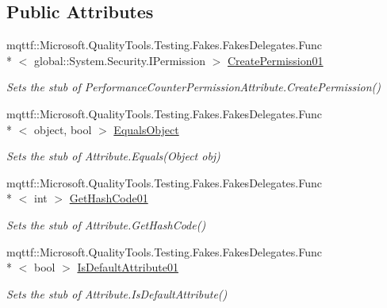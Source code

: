 \subsection*{Public Attributes}
\begin{DoxyCompactItemize}
\item 
mqttf\-::\-Microsoft.\-Quality\-Tools.\-Testing.\-Fakes.\-Fakes\-Delegates.\-Func\\*
$<$ global\-::\-System.\-Security.\-I\-Permission $>$ \hyperlink{class_system_1_1_diagnostics_1_1_fakes_1_1_stub_performance_counter_permission_attribute_a19013c5c5f0a584ab1659b14c14b2a77}{Create\-Permission01}
\begin{DoxyCompactList}\small\item\em Sets the stub of Performance\-Counter\-Permission\-Attribute.\-Create\-Permission()\end{DoxyCompactList}\item 
mqttf\-::\-Microsoft.\-Quality\-Tools.\-Testing.\-Fakes.\-Fakes\-Delegates.\-Func\\*
$<$ object, bool $>$ \hyperlink{class_system_1_1_diagnostics_1_1_fakes_1_1_stub_performance_counter_permission_attribute_af76016d8c2dd3222390676cb6d213a06}{Equals\-Object}
\begin{DoxyCompactList}\small\item\em Sets the stub of Attribute.\-Equals(\-Object obj)\end{DoxyCompactList}\item 
mqttf\-::\-Microsoft.\-Quality\-Tools.\-Testing.\-Fakes.\-Fakes\-Delegates.\-Func\\*
$<$ int $>$ \hyperlink{class_system_1_1_diagnostics_1_1_fakes_1_1_stub_performance_counter_permission_attribute_ac89609c09c8f7fb5d2bdcd1bb078560e}{Get\-Hash\-Code01}
\begin{DoxyCompactList}\small\item\em Sets the stub of Attribute.\-Get\-Hash\-Code()\end{DoxyCompactList}\item 
mqttf\-::\-Microsoft.\-Quality\-Tools.\-Testing.\-Fakes.\-Fakes\-Delegates.\-Func\\*
$<$ bool $>$ \hyperlink{class_system_1_1_diagnostics_1_1_fakes_1_1_stub_performance_counter_permission_attribute_a2014b54fad7ff677d07337ce8640ccac}{Is\-Default\-Attribute01}
\begin{DoxyCompactList}\small\item\em Sets the stub of Attribute.\-Is\-Default\-Attribute()\end{DoxyCompactList}\item 

\end{DoxyCompactItemize}
